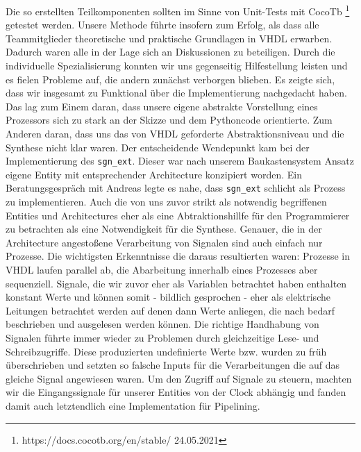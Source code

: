 \documentclass[paper=a4,fontsize=12pt,twocolumn]{scrreprt}
\begin{document}
Die so erstellten Teilkomponenten sollten im Sinne von Unit-Tests mit CocoTb \footnote{https://docs.cocotb.org/en/stable/ 24.05.2021} getestet werden.
Unsere Methode führte insofern zum Erfolg, als dass alle Teammitglieder theoretische und praktische Grundlagen in VHDL erwarben.
Dadurch waren alle in der Lage sich an Diskussionen zu beteiligen.
Durch die individuelle Spezialisierung konnten wir uns gegenseitig Hilfestellung leisten und es fielen Probleme auf, die andern zunächst verborgen blieben.
Es zeigte sich, dass wir insgesamt zu Funktional über die Implementierung nachgedacht haben.
Das lag zum Einem daran, dass unsere eigene abstrakte Vorstellung eines Prozessors sich zu stark an der Skizze und dem Pythoncode orientierte.
Zum Anderen daran, dass uns das von VHDL geforderte Abstraktionsniveau und die Synthese nicht klar waren.
Der entscheidende Wendepunkt kam bei der Implementierung des \texttt{sgn\_ext}.
Dieser war nach unserem Baukastensystem Ansatz eigene Entity mit entsprechender Architecture konzipiert worden.
Ein Beratungsgespräch mit Andreas legte es nahe, dass \texttt{sgn\_ext} schlicht als Prozess zu implementieren.
Auch die von uns zuvor strikt als notwendig begriffenen Entities und Architectures eher als eine Abtraktionshillfe für den Programmierer zu betrachten als eine Notwendigkeit für die Synthese.
Genauer, die in der Architecture angestoßene Verarbeitung von Signalen sind auch einfach nur Prozesse.
Die wichtigsten Erkenntnisse die daraus resultierten waren: Prozesse in VHDL laufen parallel ab, die Abarbeitung innerhalb eines Prozesses aber sequenziell.
Signale, die wir zuvor eher als Variablen betrachtet haben enthalten konstant Werte und können somit - bildlich gesprochen - eher als elektrische Leitungen betrachtet werden auf denen dann Werte anliegen, die nach bedarf beschrieben und ausgelesen werden können.
Die richtige Handhabung von Signalen führte immer wieder zu Problemen durch gleichzeitige Lese- und Schreibzugriffe.
Diese produzierten undefinierte Werte bzw. wurden zu früh überschrieben und setzten so falsche Inputs für die Verarbeitungen die auf das gleiche Signal angewiesen waren.
Um den Zugriff auf Signale zu steuern, machten wir die Eingangssignale für unserer Entities von der Clock abhängig und fanden damit auch letztendlich eine Implementation für Pipelining.
\end{document}
